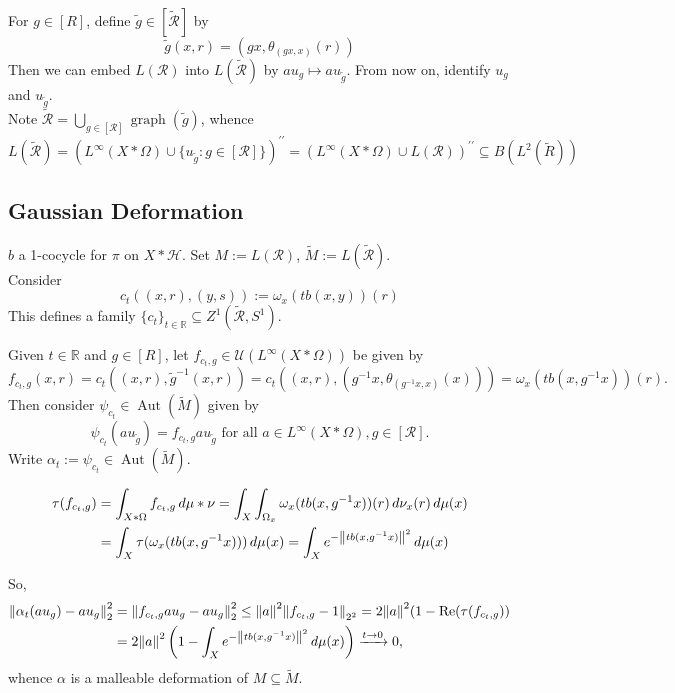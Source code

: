 \documentclass[12pt]{article}
\newcommand{\sub}{\subseteq}
\newcommand{\lr}[1]{\left(#1\right)}
\newcommand{\R}{\mathbb{R}\xspace}
\renewcommand{\H}{\mathcal{H}}
\DeclareMathOperator{\graph}{graph}
\DeclareMathOperator{\Aut}{Aut}
\theoremstyle{definition}
\theoremstyle{plain}
\theoremstyle{remark}
\begin{document}
For $ g\in [R] $, define $ \widetilde{g}\in [\widetilde{\mathcal{R}}] $ by
\[
    \widetilde{g}(x,r) = (gx, \theta_{(gx, x)}(r))
\]
Then we can embed $ L(\mathcal{R}) $ into $ L(\widetilde{\mathcal{R}}) $ by $ au_{g}\mapsto au_{\widetilde{g}} $. From now on, identify $ u_{g} $ and $ u_{\widetilde{g}} $.\\

Note $ \widetilde{\mathcal{R}} = \bigcup_{g\in[\mathcal{R}]}\graph(\widetilde{g})$, whence
\[
    L(\widetilde{\mathcal{R}}) = (L^{\infty}(X\ast \Omega)\cup \{u_{\widetilde{g}}: g\in [\mathcal{R}]\})^{\prime\prime} =  (L^{\infty}(X\ast \Omega)\cup L(\mathcal{R}))^{\prime\prime} \sub B(L^{2}(\widetilde{R}))
\]

\subsection{Gaussian Deformation}

$ b $ a 1-cocycle for $ \pi $ on $ X\ast \H $. Set $ M:=L(\mathcal{R}) $, $ \widetilde{M}:=L(\widetilde{\mathcal{R}}) $.\\

Consider
\[
    c_{t}((x,r),(y,s)) := \omega_{x}(tb(x,y))(r)
\]
This defines a family $ \{c_{t}\}_{t\in\R}\sub Z^{1}(\widetilde{\mathcal{R}},S^{1}) $.

Given $ t\in \R $ and $ g\in [R] $, let $ f_{c_t,g}\in \mathcal{U}(L^{\infty}(X\ast \Omega)) $ be given by
\[
    f_{c_t,g}(x,r) = c_{t}((x,r),\widetilde{g}^{-1}(x,r)) = c_{t}((x,r),(g^{-1}x,\theta_{(g^{-1}x,x)}(x))) = \omega_{x}(tb(x,g^{-1}x))(r).
\]
 Then consider $ \psi_{c_t}\in \Aut(\widetilde{M})$ given by 
 \[
     \psi_{c_{t}}(au_{\widetilde{g}}) = f_{c_t,g}au_{\widetilde{g}} \text{ for all } a\in L^{\infty}(X\ast \Omega), g\in [\mathcal{R}].
 \]
Write $ \alpha_{t}:=\psi_{c_{t}}\in \Aut(\widetilde{M}) $. 


\begin{align*}
    \tau(f_{c_{t},g}) &= \int_{X\ast \Omega}f_{c_{t},g}\dd{\mu\ast \nu} = \int_{X}\int_{\Omega_{x}}\omega_{x}(tb(x,g^{-1}x))(r)\dd{\nu_{x}(r)}\dd{\mu(x)} \\
    &=\int_{X} \tau(\omega_{x}(tb(x,g^{-1}x)))\dd{\mu(x)} = \int_{X} e^{-\norm{tb(x,g^{-1}x)}^{2}}\dd{\mu(x)} 
\end{align*}

So,
\begin{align*}
    \norm{\alpha_{t}(au_{g})-au_{g}}_{2}^{2}& = \norm{f_{c_{t},g}au_{g}-au_{g}}_{2}^{2}\leq \norm{a}^{2} \norm{f_{c_{t},g}-1}_{2^{2}} = 2\norm{a}^{2}(1-\Re(\tau(f_{c_{t},g})) \\
    &= 2\norm{a}^{2}\lr{1-\int_{X} e^{-\norm{tb(x,g^{-1}x)}^{2}}\dd{\mu(x)}}\xrightarrow{t\to0}0,
\end{align*}
whence $ \alpha $ is a malleable deformation of $ M\sub \widetilde{M} $.
\end{document}
